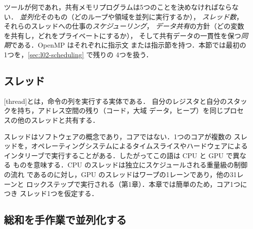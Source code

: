 \documentclass[../main.tex]{subfiles}
\begin{document}
ツールが何であれ，共有メモリプログラムは5つのことを決めなければならない．
\emph{並列化}そのもの（どのループや領域を並列に実行するか），
\emph{スレッド数}，それらのスレッドへの仕事の\emph{スケジューリング}，
\emph{データ共有}の方針（どの変数を共有し，どれをプライベートにするか），
そして共有データの一貫性を保つ\emph{同期}である．OpenMP はそれぞれに指示文
または指示節を持つ．本節では最初の1つを，\cref{sec:l02-scheduling} で残りの
4つを扱う．

\subsection{スレッド}

\begin{definition}[スレッド]
  [thread]とは，命令の列を実行する実体である．
  自分のレジスタと自分のスタックを持ち，アドレス空間の残り（コード，大域
  データ，ヒープ）を同じプロセスの他のスレッドと共有する．
\end{definition}

スレッドはソフトウェアの概念であり，コアではない．1つのコアが複数の
スレッドを，オペレーティングシステムによるタイムスライスやハードウェアによる
インタリーブで実行することがある．したがってこの語は CPU と GPU で異なる
ものを意味する．CPU のスレッドは独立にスケジュールされる重量級の制御の流れ
であるのに対し，GPU のスレッドはワープの1レーンであり，他の31レーンと
ロックステップで実行される（第1章）．本章では簡単のため，コア1つにつき
スレッド1つを仮定する．

\subsection{総和を手作業で並列化する}
\end{document}
